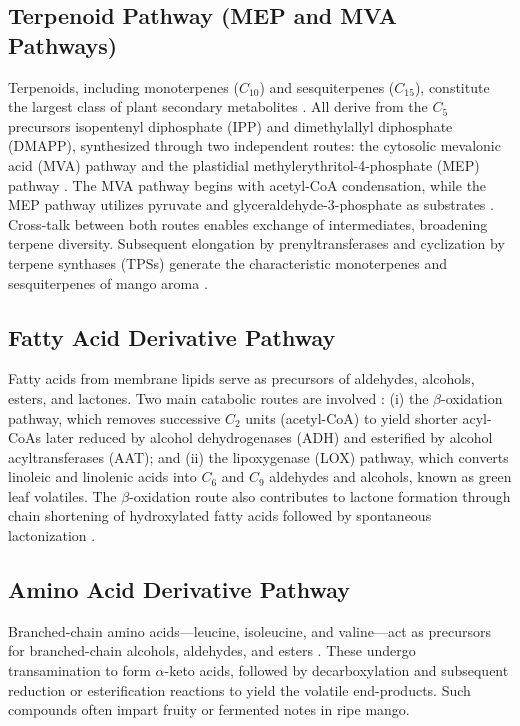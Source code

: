 \subsection{Terpenoid Pathway (MEP and MVA Pathways)}
Terpenoids, including monoterpenes ($C_{10}$) and sesquiterpenes ($C_{15}$), constitute the largest class of plant secondary metabolites \cite*{B01_TerpenesTerpenoids_2018}. All derive from the $C_{5}$ precursors isopentenyl diphosphate (IPP) and dimethylallyl diphosphate (DMAPP), synthesized through two independent routes: the cytosolic mevalonic acid (MVA) pathway and the plastidial methylerythritol-4-phosphate (MEP) pathway \cite*{A13_ElHadi2013}. The MVA pathway begins with acetyl-CoA condensation, while the MEP pathway utilizes pyruvate and glyceraldehyde-3-phosphate as substrates \cite*{A09_Barras2024}. Cross-talk between both routes enables exchange of intermediates, broadening terpene diversity. Subsequent elongation by prenyltransferases and cyclization by terpene synthases (TPSs) generate the characteristic monoterpenes and sesquiterpenes of mango aroma \cite*{A09_Barras2024,A13_ElHadi2013}.

\subsection{Fatty Acid Derivative Pathway}
Fatty acids from membrane lipids serve as precursors of aldehydes, alcohols, esters, and lactones. Two main catabolic routes are involved \cite*{A05_Chin2019,A13_ElHadi2013}: (i) the $\beta$-oxidation pathway, which removes successive $C_{2}$ units (acetyl-CoA) to yield shorter acyl-CoAs later reduced by alcohol dehydrogenases (ADH) and esterified by alcohol acyltransferases (AAT); and (ii) the lipoxygenase (LOX) pathway, which converts linoleic and linolenic acids into $C_{6}$ and $C_{9}$ aldehydes and alcohols, known as green leaf volatiles. The $\beta$-oxidation route also contributes to lactone formation through chain shortening of hydroxylated fatty acids followed by spontaneous lactonization \cite*{A14_Silva2021}.

\subsection{Amino Acid Derivative Pathway}
Branched-chain amino acids—leucine, isoleucine, and valine—act as precursors for branched-chain alcohols, aldehydes, and esters \cite*{A13_ElHadi2013}. These undergo transamination to form $\alpha$-keto acids, followed by decarboxylation and subsequent reduction or esterification reactions to yield the volatile end-products. Such compounds often impart fruity or fermented notes in ripe mango.

